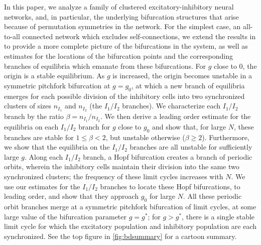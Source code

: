 \documentclass[reqno]{siamonline190516}
\begin{document}
In this paper, we analyze a family of clustered excitatory-inhibitory neural networks, and, in particular, the underlying bifurcation structures that arise because of permutation symmetries in the network. For the simplest case, an all-to-all connected network which excludes self-connections, we extend the results in \cite{Barreiro2017} to provide a more complete picture of the bifurcations in the system, as well as estimates for the locations of the bifurcation points and the corresponding branches of equilibria which emanate from these bifurcations. For $g$ close to 0, the origin is a stable equilibrium. As $g$ is increased, the origin becomes unstable in a symmetric pitchfork bifurcation at $g=g_0$, at which a new branch of equilibria emerges for each possible division of the inhibitory cells into two synchronized clusters of sizes $n_{I_1}$ and $n_{I_2}$ (the $I_1/I_2$ branches). We characterize each $I_1/I_2$ branch by the ratio $\beta = n_{I_1}/n_{I_2}$. We then derive a leading order estimate for the equilibria on each $I_1/I_2$ branch for $g$ close to $g_0$ and show that, for large $N$, these branches are stable for $1\leq \beta < 2$, but unstable otherwise ($\beta \ge 2$). Furthermore, we show that the equilibria on the $I_1/I_2$ branches are all unstable for sufficiently large $g$. Along each $I_1/I_2$ branch, a Hopf bifurcation creates a branch of periodic orbits, wherein the inhibitory cells maintain their division into the same two synchronized clusters; the frequency of these limit cycles increases with $N$. We use our estimates for the $I_1/I_2$ branches to locate these Hopf bifurcations, to leading order, and show that they approach $g_0$ for large $N$. All these periodic orbit branches merge at a symmetric pitchfork bifurcation of limit cycles, at some large value of the bifurcation parameter $g=g^*$; for $g>g^*$, there is a single stable limit cycle for which the excitatory population and inhibitory population are each synchronized. See the top figure in \cref{fig:bdsummary} for a cartoon summary.
\end{document}
